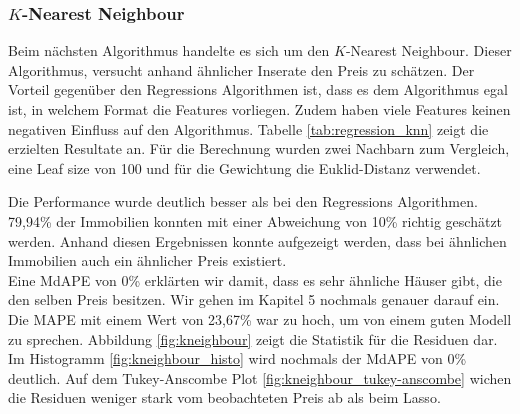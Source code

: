 \subsubsection{$K$-Nearest Neighbour}
\label{chapter:KNN}
Beim nächsten Algorithmus handelte es sich um den $K$-Nearest Neighbour. Dieser Algorithmus, versucht anhand ähnlicher Inserate den Preis zu schätzen. Der Vorteil gegenüber den Regressions Algorithmen ist, dass es dem Algorithmus egal ist, in welchem Format die Features vorliegen. Zudem haben viele Features keinen negativen Einfluss auf den Algorithmus.
Tabelle \ref{tab:regression_knn} zeigt die erzielten Resultate an. Für die Berechnung wurden zwei Nachbarn zum Vergleich, eine Leaf size von 100 und für die Gewichtung die Euklid-Distanz verwendet.

\begin{table}[ht]
\centering
{}
\caption{Ergebnisse von $K$-Nearest Neighbour}
\label{tab:regression_knn}
\end{table}

Die Performance wurde deutlich besser als bei den Regressions Algorithmen. 79,94\% der Immobilien konnten mit einer Abweichung von 10\% richtig geschätzt werden. Anhand diesen Ergebnissen konnte aufgezeigt werden, dass bei ähnlichen Immobilien auch ein ähnlicher Preis existiert.\\
Eine MdAPE von 0\% erklärten wir damit, dass es sehr ähnliche Häuser gibt, die den selben Preis besitzen. Wir gehen im Kapitel 5 nochmals genauer darauf ein. Die MAPE mit einem Wert von 23,67\% war zu hoch, um von einem guten Modell zu sprechen. Abbildung \ref{fig:kneighbour} zeigt die Statistik für die Residuen dar. Im Histogramm \ref{fig:kneighbour_histo} wird nochmals der MdAPE von 0\% deutlich. Auf dem Tukey-Anscombe Plot \ref{fig:kneighbour_tukey-anscombe} wichen die Residuen weniger stark vom beobachteten Preis ab als beim Lasso.


